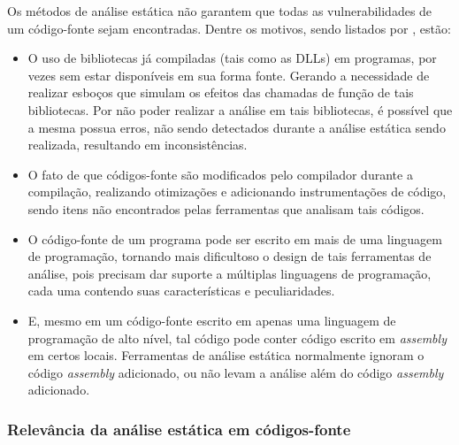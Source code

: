 \documentclass[
    12pt,                %
    openright,           %
    oneside,             %
    a4paper,             %
    english,             %
    brazil               %
]{abntex2}
\begin{document}
Os métodos de análise estática não garantem que todas as vulnerabilidades de um código-fonte sejam encontradas. Dentre os motivos, sendo listados por , estão:

\begin{itemize}
\item 
O uso de bibliotecas já compiladas (tais como as DLLs) em programas, por vezes sem estar disponíveis em sua forma fonte. Gerando a necessidade de realizar esboços 
que simulam os efeitos das chamadas de função de tais bibliotecas. Por não poder realizar a análise em tais bibliotecas, é possível que a mesma possua erros, não sendo detectados durante a 
análise estática sendo realizada, resultando em inconsistências.
\item
O fato de que códigos-fonte são modificados pelo compilador durante a compilação, realizando otimizações e adicionando instrumentações de código, sendo itens não encontrados pelas 
ferramentas que analisam tais códigos.
\item 
O código-fonte de um programa pode ser escrito em mais de uma linguagem de programação, tornando mais dificultoso o design de tais ferramentas de análise, pois precisam dar suporte a 
múltiplas linguagens de programação, cada uma contendo suas características e peculiaridades.
\item
E, mesmo em um código-fonte escrito em apenas uma linguagem de programação de alto nível, tal código pode conter código escrito em \textit{assembly} em certos locais. 
Ferramentas de análise estática normalmente ignoram o código \textit{assembly} adicionado, ou não levam a análise além do código \textit{assembly} adicionado.
\end{itemize}

\subsubsection{Relevância da análise estática em códigos-fonte}
\end{document}

